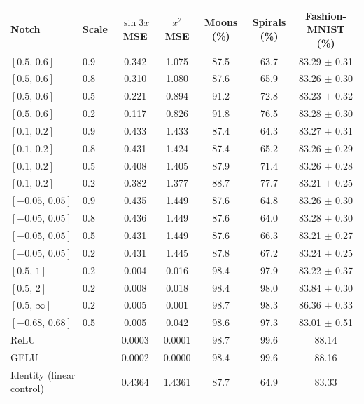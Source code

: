 \begin{tabular}{llccccc}
\toprule
Notch & Scale & $\sin 3x$ MSE & $x^2$ MSE & Moons (\%) & Spirals (\%) & Fashion-MNIST (\%) \\
\midrule
$[0.5,\,0.6]$ & 0.9 & 0.342 & 1.075 & 87.5 & 63.7 & 83.29 $\pm$ 0.31 \\
$[0.5,\,0.6]$ & 0.8 & 0.310 & 1.080 & 87.6 & 65.9 & 83.26 $\pm$ 0.30 \\
$[0.5,\,0.6]$ & 0.5 & 0.221 & 0.894 & 91.2 & 72.8 & 83.23 $\pm$ 0.32 \\
$[0.5,\,0.6]$ & 0.2 & 0.117 & 0.826 & 91.8 & 76.5 & 83.28 $\pm$ 0.30 \\
$[0.1,\,0.2]$ & 0.9 & 0.433 & 1.433 & 87.4 & 64.3 & 83.27 $\pm$ 0.31 \\
$[0.1,\,0.2]$ & 0.8 & 0.431 & 1.424 & 87.4 & 65.2 & 83.26 $\pm$ 0.29 \\
$[0.1,\,0.2]$ & 0.5 & 0.408 & 1.405 & 87.9 & 71.4 & 83.26 $\pm$ 0.28 \\
$[0.1,\,0.2]$ & 0.2 & 0.382 & 1.377 & 88.7 & 77.7 & 83.21 $\pm$ 0.25 \\
$[-0.05,\,0.05]$ & 0.9 & 0.435 & 1.449 & 87.6 & 64.8 & 83.26 $\pm$ 0.30 \\
$[-0.05,\,0.05]$ & 0.8 & 0.436 & 1.449 & 87.6 & 64.0 & 83.28 $\pm$ 0.30 \\
$[-0.05,\,0.05]$ & 0.5 & 0.431 & 1.449 & 87.6 & 66.3 & 83.21 $\pm$ 0.27 \\
$[-0.05,\,0.05]$ & 0.2 & 0.431 & 1.445 & 87.8 & 67.2 & 83.24 $\pm$ 0.25 \\
$[0.5,\,1]$ & 0.2 & 0.004 & 0.016 & 98.4 & 97.9 & 83.22 $\pm$ 0.37 \\
$[0.5,\,2]$ & 0.2 & 0.008 & 0.018 & 98.4 & 98.0 & 83.84 $\pm$ 0.30 \\
$[0.5,\,\infty]$ & 0.2 & 0.005 & 0.001 & 98.7 & 98.3 & 86.36 $\pm$ 0.33 \\
$[-0.68,\,0.68]$ & 0.5 & 0.005 & 0.042 & 98.6 & 97.3 & 83.01 $\pm$ 0.51 \\
\midrule
\multicolumn{2}{l}{ReLU} & 0.0003 & 0.0001 & 98.7 & 99.6 & 88.14 \\
\multicolumn{2}{l}{GELU} & 0.0002 & 0.0000 & 98.4 & 99.6 & 88.16 \\
\multicolumn{2}{l}{Identity (linear control)} & 0.4364 & 1.4361 & 87.7 & 64.9 & 83.33 \\
\bottomrule
\end{tabular}
